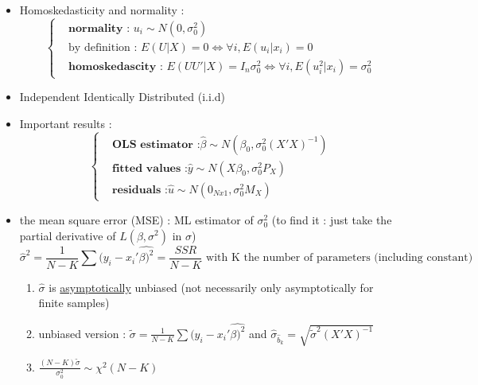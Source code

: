 \documentclass{article}
\begin{document}
\begin{errorbox}
\begin{itemize}
    \item Homoskedasticity and normality : 
    \begin{equation}
    \left\{
    \begin{aligned}
        &\textbf{normality : } u_i \sim N(0,\sigma_0^2) \\
        &\text{by definition : }E(U|X)=0 \Longleftrightarrow \forall i, E(u_i|x_i) = 0\\
        &\textbf{homoskedascity : } E(UU'|X) = I_n\sigma_0^2 \Longleftrightarrow \forall i, E(u_i^2|x_i) = \sigma_0^2
    \end{aligned}
    \right.
    \end{equation}
    \item Independent Identically Distributed (i.i.d)
    \item Important results : 
    \begin{equation}
    \left\{
    \begin{aligned}
        &\textbf{OLS estimator :} \hat{\beta} \sim N(\beta_0,\sigma_0^2(X'X)^{-1})\\
        &\textbf{fitted values :}\hat{y} \sim N(X\beta_0, \sigma_0^2P_X)\\
        &\textbf{residuals :}\hat{u}\sim N(0_{Nx1},\sigma_0^2M_X)
    \end{aligned}
    \right.
    \end{equation}
    \item the mean square error (MSE) : ML estimator of $\sigma_0^2$ (to find it : just take the partial derivative of $L(\beta,\sigma^2)$ in $\sigma$)
    \begin{equation}
        \hat{\sigma}^2 = \frac{1}{N-K}\sum(y_i-x_i'\hat{\beta)^2} = \frac{SSR}{N-K} \text{ with K the number of parameters (including constant)}
    \end{equation} 
    \begin{enumerate}
        \item $\hat{\sigma}$ is \underline{asymptotically} unbiased (not necessarily only asymptotically for finite samples)
        \item unbiased version  : $\tilde{\sigma}=\frac{1}{N-K}\sum(y_i-x_i'\hat{\beta)^2}$ and $\hat{\sigma}_{\hat{b}_k} = \sqrt{\tilde{\sigma}^2(X'X)^{-1}}$
        \item $\frac{(N-K)\tilde{\sigma}}{\sigma_0^2}\sim \chi^2(N-K)$
    \end{enumerate}
\end{itemize}
\end{errorbox}
\end{document}
